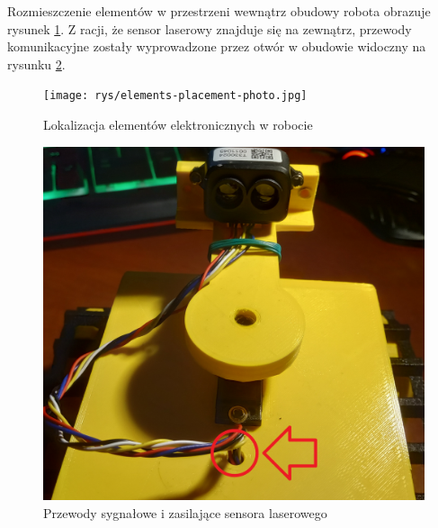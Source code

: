 Rozmieszczenie elementów w przestrzeni wewnątrz obudowy robota obrazuje rysunek \ref{fig:electronic-elements-placement}. Z racji, że sensor laserowy znajduje się na zewnątrz, przewody komunikacyjne zostały wyprowadzone przez otwór w obudowie widoczny na rysunku \ref{fig:lidar-placement}. 

\begin{figure}[ht]
	\centering
		\texttt{[image: rys/elements-placement-photo.jpg]}
	\caption{Lokalizacja elementów elektronicznych w robocie}
	\label{fig:electronic-elements-placement}
\end{figure}

\begin{figure}[ht]
	\centering
		\includegraphics[width=0.6\linewidth]{rys/tower-placement-photo.jpg}
	\caption{Przewody sygnałowe i zasilające sensora laserowego}
	\label{fig:lidar-placement}
\end{figure}
